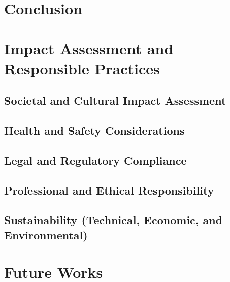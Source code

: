 \section{Conclusion}
\lipsum[7-8] 

\section{Impact Assessment and Responsible Practices}
\subsection{Societal and Cultural Impact Assessment}
\subsection{Health and Safety Considerations}
\subsection{Legal and Regulatory Compliance}
\subsection{Professional and Ethical Responsibility}
\subsection{Sustainability (Technical, Economic, and Environmental)}


\section{Future Works}
\lipsum[7-8] 